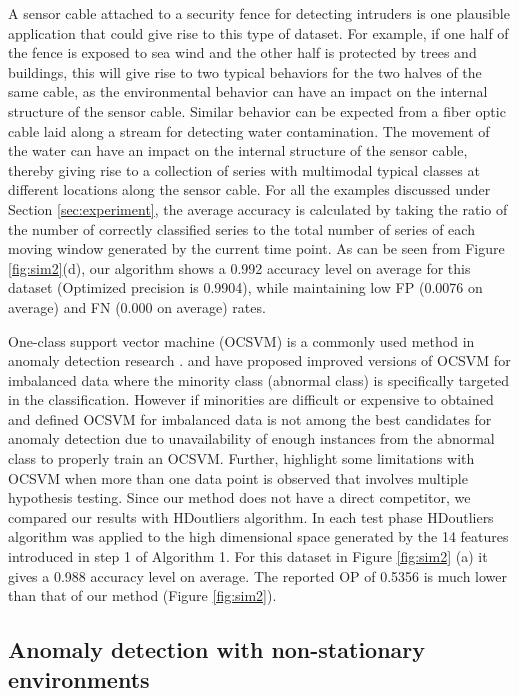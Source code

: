 \documentclass[12pt]{article}
\begin{document}
A sensor cable attached to a security fence for detecting intruders is
one plausible application that could give rise to this type of dataset.
For example, if one half of the fence is exposed to sea wind and the
other half is protected by trees and buildings, this will give rise to
two typical behaviors for the two halves of the same cable, as the
environmental behavior can have an impact on the internal structure of
the sensor cable. Similar behavior can be expected from a fiber optic
cable laid along a stream for detecting water contamination. The
movement of the water can have an impact on the internal structure of
the sensor cable, thereby giving rise to a collection of series with
multimodal typical classes at different locations along the sensor
cable. For all the examples discussed under Section
\ref{sec:experiment}, the average accuracy is calculated by taking the
ratio of the number of correctly classified series to the total number
of series of each moving window generated by the current time point. As
can be seen from Figure \ref{fig:sim2}(d), our algorithm shows a 0.992
accuracy level on average for this dataset (Optimized precision is
0.9904), while maintaining low FP (0.0076 on average) and FN (0.000 on
average) rates.

One-class support vector machine (OCSVM) is a commonly used method in
anomaly detection research
\citep{ma2003time, mahadevan2009fault, rajasegarar2010centered}.
\citet{raskutti2004extreme} and \citet{zhuang2006parameter} have
proposed improved versions of OCSVM for imbalanced data where the
minority class (abnormal class) is specifically targeted in the
classification. However if minorities are difficult or expensive to
obtained and defined OCSVM for imbalanced data is not among the best
candidates for anomaly detection due to unavailability of enough
instances from the abnormal class to properly train an OCSVM. Further,
\citet{luca2014anomaly} highlight some limitations with OCSVM when more
than one data point is observed that involves multiple hypothesis
testing. Since our method does not have a direct competitor, we compared
our results with HDoutliers algorithm. In each test phase HDoutliers
algorithm was applied to the high dimensional space generated by the 14
features introduced in step 1 of Algorithm 1. For this dataset in Figure
\ref{fig:sim2} (a) it gives a 0.988 accuracy level on average. The
reported OP of 0.5356 is much lower than that of our method (Figure
\ref{fig:sim2}).

\hypertarget{anomaly-detection-with-non-stationary-environments}{%
\subsection{Anomaly detection with non-stationary
environments}\label{anomaly-detection-with-non-stationary-environments}}
\end{document}
